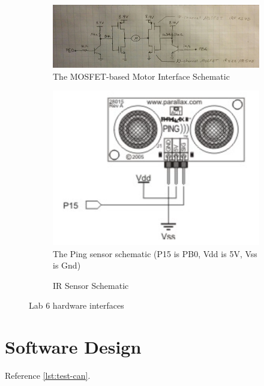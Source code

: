 \documentclass[12pt]{article}
\newcommand{\todo}[1]{{\color{red}{\LARGE TODO} #1}}
\begin{document}
\begin{figure}[H]
  \centering
  \begin{subfigure}[b]{0.45\textwidth}
    \includegraphics[width=\textwidth]{./img/motor-schematic.png}
    \caption{The MOSFET-based Motor Interface Schematic}
    \label{fig:mosfet-schematic}
  \end{subfigure}
  \begin{subfigure}[b]{0.45\textwidth}
    \includegraphics[width=\textwidth]{./img/ping-schematic.png}
    \caption{The Ping sensor schematic (P15 is PB0, Vdd is 5V, Vss is Gnd)}
    \label{fig:ping-schematic}
  \end{subfigure}
  \begin{subfigure}[b]{0.45\textwidth}
    \todo{IR Sensor Schematic}
  \end{subfigure}
  \caption{Lab 6 hardware interfaces}
  \label{fig:hardware-design}
\end{figure}

\section{Software Design}
Reference \cref{lst:test-can}.
\end{document}
